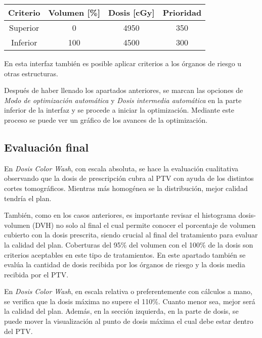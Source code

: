 \documentclass{article}
\begin{document}
\begin{table}[h]
    \centering
    \begin{tabular}{|c|c|c|c|}
    \hline
    \textbf{Criterio} & \textbf{Volumen {[}\%{]}} & \textbf{Dosis {[}cGy{]}} & \textbf{Prioridad} \\ \hline \hline
    Superior          & 0                         & 4950                     & 350                \\ \hline
    Inferior          & 100                       & 4500                     & 300                \\ \hline
    \end{tabular}
\end{table}

En esta interfaz también es posible aplicar criterios a los órganos de riesgo u otras estructuras.

Después de haber llenado los apartados anteriores, se marcan las opciones de \textit{Modo de optimización automática} y \textit{Dosis intermedia automática} en la parte inferior de la interfaz y se procede a iniciar la optimización. Mediante este proceso se puede ver un gráfico de los avances de la optimización.

\subsection{Evaluación final}

En \textit{Dosis Color Wash}, con escala absoluta, se hace la evaluación cualitativa observando que la dosis de prescripción cubra al PTV con ayuda de los distintos cortes tomográficos. Mientras más homogénea se la distribución, mejor calidad tendría el plan.

También, como en los casos anteriores, es importante revisar el histograma dosis-volumen (DVH) no solo al final el cual permite conocer el porcentaje de volumen cubierto con la dosis prescrita, siendo crucial al final del tratamiento para evaluar la calidad del plan. Coberturas del 95\% del volumen con el 100\% de la dosis son criterios aceptables en este tipo de tratamientos. En este apartado también se evalúa la cantidad de dosis recibida por los órganos de riesgo y la dosis media recibida por el PTV.

En \textit{Dosis Color Wash}, en escala relativa o preferentemente con cálculos a mano, se verifica que la dosis máxima no supere el 110\%. Cuanto menor sea, mejor será la calidad del plan. Además, en la sección izquierda, en la parte de dosis, se puede mover la visualización al punto de dosis máxima el cual debe estar dentro del PTV.
\end{document}
